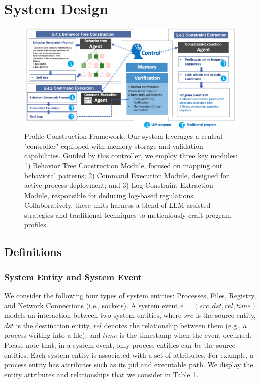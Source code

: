 \section{System Design}

\begin{figure}[h]
    \centering
      \includegraphics[width=1\textwidth]{figs/prompt.jpg}
    \caption{Profile Construction Framework: Our system leverages a central "controller" equipped with memory storage and validation capabilities. Guided by this controller, we employ three key modules: 1) Behavior Tree Construction Module, focused on mapping out behavioral patterns; 2) Command Execution Module, designed for active process deployment; and 3) Log Constraint Extraction Module, responsible for deducing log-based regulations. Collaboratively, these units harness a blend of LLM-assisted strategies and traditional techniques to meticulously craft program profiles.}
    \label{fig-framework}
    \end{figure}

\subsection{Definitions}

\subsubsection{System Entity and System Event}
We consider the following four types of system entities: Processes, Files, Registry, and Network Connections (i.e., sockets). A system event $e = (src, dst, rel, time)$ models an interaction between two system entities, where $src$ is the source entity, $dst$ is the destination entity, $rel$ denotes the relationship between them (e.g., a process writing into a file), and $time$ is the timestamp when the event occurred. Please note that, in a system event, only process entities can be the source entities. Each system entity is associated with a set of attributes. For example, a process entity has attributes such as its pid and executable path. We display the entity attributes and relationships that we consider in Table 1.

